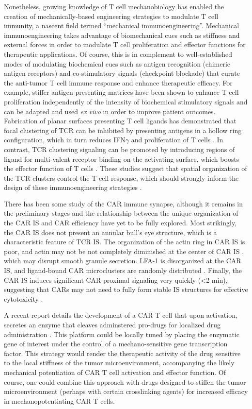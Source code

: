 Nonetheless, growing knowledge of T cell mechanobiology has enabled the  creation of mechanically-based engineering strategies to modulate T cell immunity, a nascent field termed “mechanical immunoengineering”. Mechanical immunoengineering takes advantage of biomechanical cues such as stiffness and external forces in order to modulate T cell proliferation and effector functions for therapeutic applications. Of course, this is in complement to well-established modes of modulating biochemical cues such as antigen recognition (chimeric antigen receptors) and co-stimulatory signals (checkpoint blockade) that curate the anti-tumor T cell immune response and enhance therapeutic efficacy. For example, stiffer antigen-presenting matrices have been shown to enhance T cell proliferation independently of the intensity of biochemical stimulatory signals \cite{Lei2020} and can be adapted and used \textit{ex vivo} in order to improve patient outcomes. Fabrication of planar surfaces presenting T cell ligands has demonstrated that focal clustering of TCR can be inhibited by presenting antigens in a hollow ring configuration, which in turn reduces IFN$\gamma$ and proliferation of T cells \cite{Schraml2015}. In contrast, TCR clustering signaling can be promoted by introducing regions of ligand for multi-valent receptor binding on the activating surface, which boosts the effector function of T cells \cite{OConnor2012, Schraml2015}.  These studies suggest that spatial organization of the TCR clusters control the T cell response,  which should strongly inform the design of these immunoengineering strategies \cite{Aramesh2019}.

There has been some study of the CAR immune synapse, although it remains in the preliminary stages and the relationship between the unique organization of the CAR IS and CAR efficiency have yet to be fully explored. Most strikingly, the CAR IS does not present an annular bull's eye structure, which is a characteristic feature of TCR IS.  The organization of the actin ring in CAR IS is poor, and actin may not be not completely diminished at the center of CAR IS \cite{Xiong2018}, which may disrupt smooth granule secretion. LFA-1 is disorganized at the CAR IS, and ligand-bound CAR microclusters are randomly distributed \cite{Davenport2019}. Finally, the CAR IS induces significant CAR-proximal signaling very quickly (\textless 2 min), suggesting that CARs may not need to fully form stable IS structures for effective cytotoxicity \cite{Li2020, Watanabe2018}. 

A recent report details the development of a CAR T cell that upon activation, secretes an enzyme that cleaves adminstered pro-drugs for localized drug administration \cite{Gardner2021}. This platform could be locally tuned by placing the enzymatic gene of interest under the control of a mechano-sensitive gene transcription factor. This strategy would render the therapeutic activity of the drug sensitive to the local stiffness of the tumor microenvironment, accompanying the likely mechanical potentiation of CAR T cell activation and effector function. Of course, one could combine this approach with drugs designed to stiffen the tumor microenvironment (perhaps with certain crosslinking agents) for increased efficacy in mechanopotentiating CAR T cells. 

